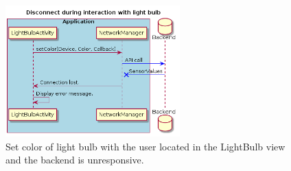 \documentclass[a4paper]{article}
\begin{document}
\begin{figure}[H]
    \centering
    \includegraphics[width=0.6\textwidth]{seq3.png}
    \caption{Set color of light bulb with the user located in the LightBulb view and the backend is unresponsive.}
    \label{fig:seq3}
\end{figure}
	
\end{document}
